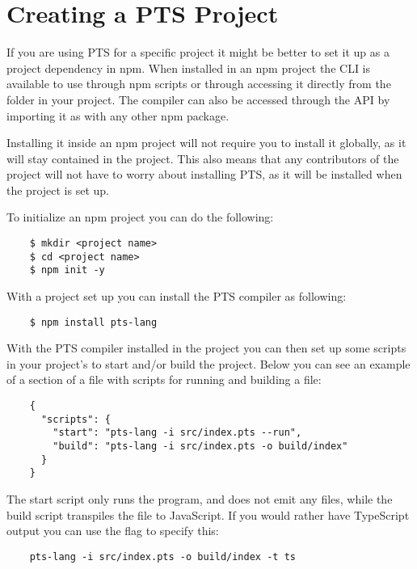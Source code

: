 \section{Creating a PTS Project}\label{sec:creating-a-pts-project}

If you are using PTS for a specific project it might be better to set it up as a project dependency in npm.
When installed in an npm project the CLI is available to use through npm scripts or through accessing it directly from the  folder in your project.
The compiler can also be accessed through the API by importing it as with any other npm package.

Installing it inside an npm project will not require you to install it globally, as it will stay contained in the project.
This also means that any contributors of the project will not have to worry about installing PTS, as it will be installed when the project is set up.

To initialize an npm project you can do the following:

\begin{verbatim}
    $ mkdir <project name>
    $ cd <project name>
    $ npm init -y
\end{verbatim}

With a project set up you can install the PTS compiler as following:

\begin{verbatim}
    $ npm install pts-lang
\end{verbatim}

With the PTS compiler installed in the project you can then set up some scripts in your project's  to start and/or build the project.
Below you can see an example of a section of a  file with scripts for running and building a file:

\begin{verbatim}
    {
      "scripts": {
        "start": "pts-lang -i src/index.pts --run",
        "build": "pts-lang -i src/index.pts -o build/index"
      }
    }
\end{verbatim}

The start script only runs the program, and does not emit any files, while the build script transpiles the  file to JavaScript.
If you would rather have TypeScript output you can use the  flag to specify this:

\begin{verbatim}
    pts-lang -i src/index.pts -o build/index -t ts
\end{verbatim}

